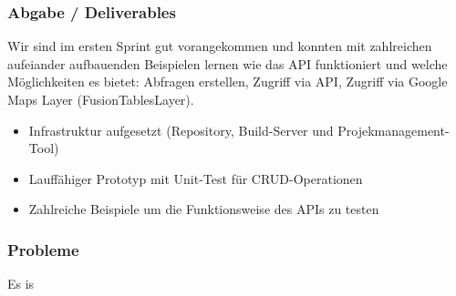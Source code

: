 \subsubsection{Abgabe / Deliverables}
Wir sind im ersten Sprint gut vorangekommen und konnten mit zahlreichen aufeiander aufbauenden Beispielen lernen wie das API funktioniert und welche Möglichkeiten es bietet: Abfragen erstellen, Zugriff via API, Zugriff via Google Maps Layer (FusionTablesLayer).

\begin{itemize}
	\item Infrastruktur aufgesetzt (Repository, Build-Server und Projekmanagement-Tool)
	\item Lauffähiger Prototyp mit Unit-Test für CRUD-Operationen
	\item Zahlreiche Beispiele um die Funktionsweise des APIs zu testen
\end{itemize}

\subsubsection{Probleme}
Es is 